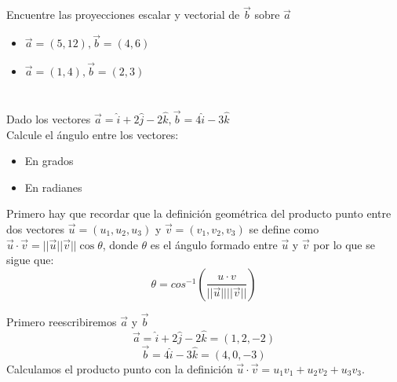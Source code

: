 \documentclass[12pt]{article}
\begin{document}
\begin{itemize}
\section{}

Encuentre las proyecciones escalar y vectorial de $\vec{b}$ sobre $\vec{a}$

\begin{itemize}
  
\item $\vec{a}= (5,12), \vec{b}=(4,6)$
  
\item $\vec{a}= (1,4), \vec{b}=(2,3)$
  
\end{itemize}

\section{}

Dado los vectores $\vec{a} = \hat{i} + 2\hat{j}-2\hat{k}, \vec{b} = 4\hat{i} -3\hat{k}$ \\
Calcule el ángulo entre los vectores:

\begin{itemize}

\item En grados

\item En radianes

\end{itemize}

Primero hay que recordar que la definición geométrica del producto punto entre dos vectores $\vec{u} = (u_1, u_2, u_3)$ y  $\vec{v} = (v_1, v_2, v_3)$ se define como  $\vec{u} \cdot \vec{v} = ||\vec{u} || \vec{v}|| \cos{\theta}$, donde $\theta$ es el ángulo formado entre $\vec{u}$ y $\vec{v}$  por lo que se sigue que:
\[
\theta = cos^{-1 }\left(\frac{u \cdot v}{||\vec{u}|| ||\vec{v}||}\right)
\]

Primero reescribiremos $\vec{a}$ y $\vec{b}$
\[
   \vec{a} =  \hat{i} + 2\hat{j}-2\hat{k} = (1, 2, -2)
   \]
   \[
   \vec{b} =4\hat{i} -3\hat{k}= (4, 0, -3)
   \]
Calculamos el producto punto con la definición  $\vec{u} \cdot \vec{v} = u_1v_1 + u_2v_2+u_3v_3$.


\end{itemize}
\end{document}
